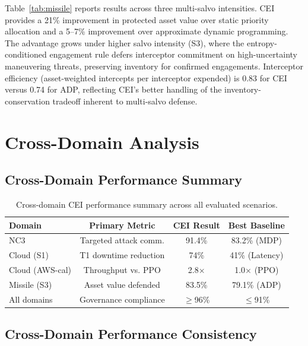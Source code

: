 \documentclass[runningheads]{llncs}
\begin{document}
Table~\ref{tab:missile} reports results across three multi-salvo intensities. CEI provides a 21\% improvement in protected asset value over static priority allocation and a 5--7\% improvement over approximate dynamic programming. The advantage grows under higher salvo intensity (S3), where the entropy-conditioned engagement rule defers interceptor commitment on high-uncertainty maneuvering threats, preserving inventory for confirmed engagements. Interceptor efficiency (asset-weighted intercepts per interceptor expended) is 0.83 for CEI versus 0.74 for ADP, reflecting CEI's better handling of the inventory-conservation tradeoff inherent to multi-salvo defense.

\section{Cross-Domain Analysis}
\label{sec:crossdomain}

\subsection{Cross-Domain Performance Summary}

\begin{table}[ht]
\caption{Cross-domain CEI performance summary across all evaluated scenarios.}
\label{tab:cross}
\centering
\small
\begin{tabular}{lccc}
\toprule
Domain & Primary Metric & CEI Result & Best Baseline \\
\midrule
NC3            & Targeted attack comm.  & 91.4\%       & 83.2\% (MDP) \\
Cloud (S1)     & T1 downtime reduction  & 74\%         & 41\% (Latency) \\
Cloud (AWS-cal)& Throughput vs. PPO     & 2.8$\times$  & 1.0$\times$ (PPO) \\
Missile (S3)   & Asset value defended   & 83.5\%       & 79.1\% (ADP) \\
\midrule
All domains    & Governance compliance  & $\geq$96\%   & $\leq$91\% \\
\bottomrule
\end{tabular}
\end{table}

\subsection{Cross-Domain Performance Consistency}
\end{document}
